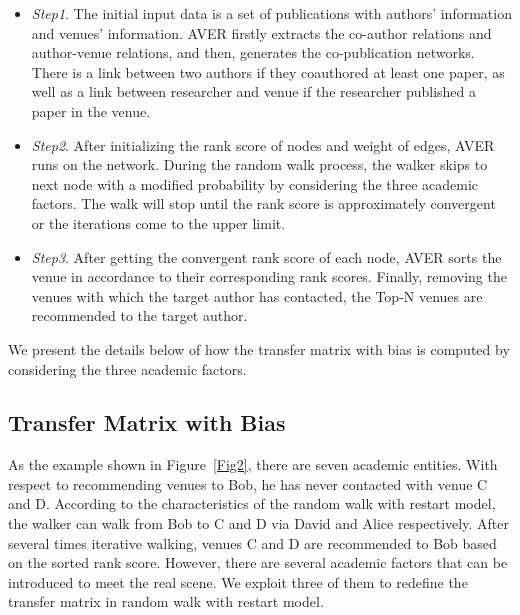 \documentclass[9pt]{acm_proc_article-sp}
\begin{document}
\begin{itemize}
  \item \emph{Step1}. The initial input data is a set of publications with authors' information and venues' information. AVER firstly extracts the co-author relations and author-venue relations, and then, generates the co-publication networks. There is a link between two authors if they coauthored at least one paper, as well as a link between researcher and venue if the researcher published a paper in the venue.
  \item \emph{Step2}. After initializing the rank score of nodes and weight of edges, AVER runs on the network. During the random walk process, the walker skips to next node with a modified probability by considering the three academic factors. The walk will stop until the rank score is approximately convergent or the iterations come to the upper limit.
  \item \emph{Step3}. After getting the convergent rank score of each node, AVER sorts the venue in accordance to their corresponding rank scores. Finally, removing the venues with which the target author has contacted, the Top-N venues are recommended to the target author.
\end{itemize}

We present the details below of how the transfer matrix with bias is computed by considering the three academic factors.

\subsection{Transfer Matrix with Bias}
As the example shown in Figure~\ref{Fig2}, there are seven academic entities. With respect to recommending venues to Bob, he has never contacted with venue C and D. According to the characteristics of the random walk with restart model, the walker can walk from Bob to C and D via David and Alice respectively. After several times iterative walking, venues C and D are recommended to Bob based on the sorted rank score. However, there are several academic factors that can be introduced to meet the real scene. We exploit three of them to redefine the transfer matrix in random walk with restart model.
\end{document}
